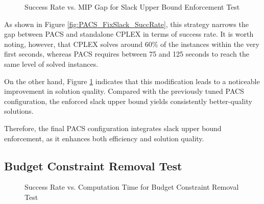 \begin{figure}[H]
\centering
\begin{minipage}{0.6\columnwidth}
\centering
\resizebox{\linewidth}{!}{}
\end{minipage}%
\hfill
\begin{minipage}{0.4\columnwidth}
\centering
\resizebox{\linewidth}{!}{}
\end{minipage}
\caption{Success Rate vs. MIP Gap for Slack Upper Bound Enforcement Test}
\label{fig:PACS_FixSlack_MGAP}
\end{figure}

As shown in Figure \ref{fig:PACS_FixSlack_SuccRate}, this strategy narrows the gap between PACS and standalone CPLEX in terms of success rate. It is worth noting, however, that CPLEX solves around 60\% of the instances within the very first seconds, whereas PACS requires between 75 and 125 seconds to reach the same level of solved instances.

On the other hand, Figure \ref{fig:PACS_FixSlack_MGAP} indicates that this modification leads to a noticeable improvement in solution quality. Compared with the previously tuned PACS configuration, the enforced slack upper bound yields consistently better-quality solutions.

Therefore, the final PACS configuration integrates slack upper bound enforcement, as it enhances both efficiency and solution quality.

\subsection{Budget Constraint Removal Test}\label{sec:test_bdg_constr}
 \begin{figure}[H]
    \centering
    \begin{minipage}{0.6\columnwidth}
        \centering
        \resizebox{\linewidth}{!}{}
    \end{minipage}%
    \hfill
    \begin{minipage}{0.4\columnwidth} 
        \centering
        \resizebox{\linewidth}{!}{}
    \end{minipage}
    \caption{Success Rate vs. Computation Time for Budget Constraint Removal Test}
    \label{fig:PACS_BDGRem_SuccRate}
\end{figure}


